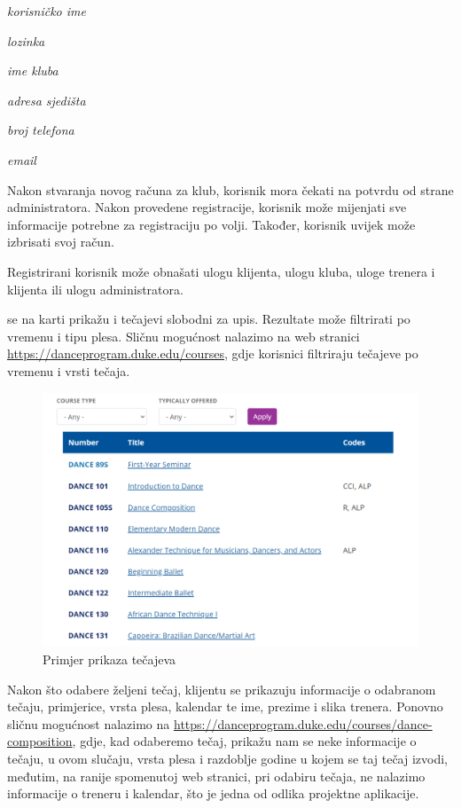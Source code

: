 \begin{packed_item}
	\item \textit{korisničko ime}
	\item \textit{lozinka}
	\item \textit{ime kluba}
	\item \textit{adresa sjedišta}
	\item \textit{broj telefona}
	\item \textit{email}
\end{packed_item}

Nakon stvaranja novog računa za klub, korisnik mora čekati na potvrdu od strane administratora.  Nakon provedene registracije, korisnik može mijenjati sve informacije potrebne za registraciju po volji. Također, korisnik uvijek može izbrisati svoj račun.

Registrirani korisnik može obnašati ulogu klijenta, ulogu kluba, uloge trenera i klijenta ili ulogu administratora.

 se na karti prikažu i tečajevi slobodni za upis. Rezultate može filtrirati po vremenu i tipu plesa. Sličnu mogućnost nalazimo na web stranici \url{https://danceprogram.duke.edu/courses}, gdje korisnici filtriraju tečajeve po vremenu i vrsti tečaja.

\begin{figure}[H]
	\centering
	\includegraphics[scale=0.3]{slike/opis_1.png}
	\caption{Primjer prikaza tečajeva}
	\label{fig:screenshot001}
\end{figure}

Nakon što odabere željeni tečaj, klijentu se prikazuju informacije o odabranom tečaju, primjerice, vrsta plesa, kalendar te ime, prezime i slika trenera. Ponovno sličnu mogućnost nalazimo na \url{https://danceprogram.duke.edu/courses/dance-composition}, gdje, kad odaberemo tečaj, prikažu nam se neke informacije o tečaju, u ovom slučaju, vrsta plesa i razdoblje godine u kojem se taj tečaj izvodi, međutim, na ranije spomenutoj web stranici, pri odabiru tečaja, ne nalazimo informacije o treneru i kalendar, što je jedna od odlika projektne aplikacije.

